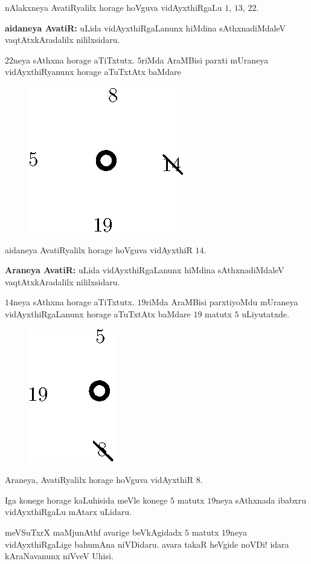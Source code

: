 nAlakxneya AvatiRyalilx horage hoVguva vidAyxthiRgaLu $1$, $13$, $22$.

{\bf aidaneya AvatiR:} uLida vidAyxthiRgaLanunx hiMdina sAthxnadiMdaleV vaqtAtxkAra\-dalilx nililxsidaru.

$22$neya sAthxna horage aTiTxtutx. $5$riMda AraMBisi parxti mUraneya vidAyxthiRyanunx horage aTuTxtAtx baMdare
\begin{figure}[H]
\centering
\includegraphics[scale=0.8]{src/figures/fig13.eps}
\end{figure}

aidaneya AvatiRyalilx horage hoVguva vidAyxthiR $14$.

{\bf Araneya AvatiR:} uLida vidAyxthiRgaLanunx hiMdina sAthxnadiMdaleV vaqtAtxkAra\-dalilx nililxsidaru.

$14$neya sAthxna horage aTiTxtutx. $19$riMda AraMBisi parxtiyoMdu mUraneya vidAyxthiRgaLanunx horage aTuTxtAtx baMdare $19$ matutx $5$ uLiyutatxde. 
\begin{figure}[H]
\centering
\includegraphics[scale=0.8]{src/figures/fig14.eps}
\end{figure}

Araneya, AvatiRyalilx horage hoVguva vidAyxthiR $8$.

Iga konege horage kaLuhisida meVle konege $5$ matutx $19$neya sAthxnada ibabxru vidAyxthiRgaLu mAtarx uLidaru.

meVSuTxrX maMjunAthf avarige beVkAgidadx $5$ matutx $19$neya vidAyxthiRgaLige bahumAna niVDidaru. avara takaR heVgide noVDi! idara kAraNavanunx niVveV Uhisi.
